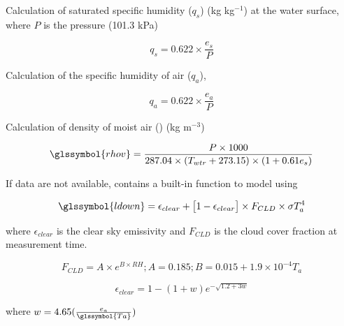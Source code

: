 \documentclass[final,3p,times,authoryear]{elsarticle}
\begin{document}
Calculation of saturated specific humidity ($q_{s}$) (kg kg$^{-1}$) at the water surface, where $P$ is the pressure (101.3 kPa) 
		
\begin{equation} 
q_{s} = 0.622 \times \frac{e_{s}}{P}
\label{eq:qs} \end{equation}		

Calculation of the specific humidity of air ($q_{a}$), 

\begin{equation} 
q_{a} = 0.622 \times \frac{e_{a}}{P}
\label{eq:qa} \end{equation}

Calculation of density of moist air () (kg m$^{-3}$)

\begin{equation} 
\glssymbol{rhov} = \frac{P \times 1000}{287.04 \times (T_{wtr} + 273.15) \times (1 + 0.61 e_{s})}
\label{eq:rhov} \end{equation}

If  data are not available,  contains a built-in function to model  using \citep{Loridan2010} 

\begin{equation} 
\glssymbol{ldown} = \epsilon_{clear} + \big[ 1 -\epsilon_{clear}  \big] \times F_{CLD} \times \sigma T^{4}_{a}
\label{eq:ldown} \end{equation}

where $\epsilon_{clear}$ is the clear sky emissivity and $F_{CLD}$ is the cloud cover fraction at measurement time. 

\begin{equation} 
F_{CLD} = A \times e^{B \times RH} ; A=0.185; B=0.015 + 1.9 \times 10^{-4}T_{a}
\label{eq:fcld} \end{equation}

\begin{equation} 
\epsilon_{clear} = 1-(1+w)e^{-\sqrt{1.2+3w}}
\label{eq:eclear} \end{equation}

where $w = 4.65(\frac{e_{a} }{\glssymbol{Ta}})$


%
\end{document}
